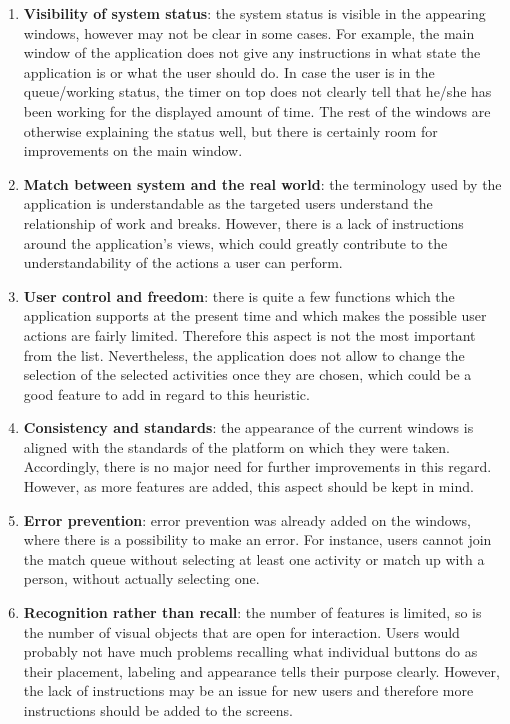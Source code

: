 \begin{enumerate}
	\item \textbf{Visibility of system status}: the system status is visible in the appearing windows, however may not be clear in some cases. For example, the main window of the application does not give any instructions in what state the application is or what the user should do. In case the user is in the queue/working status, the timer on top does not clearly tell that he/she has been working for the displayed amount of time. The rest of the windows are otherwise explaining the status well, but there is certainly room for improvements on the main window. 
	\item \textbf{Match between system and the real world}: the terminology used by the application is understandable as the targeted users understand the relationship of work and breaks. However, there is a lack of instructions around the application's views, which could greatly contribute to the understandability of the actions a user can perform.
	\item \textbf{User control and freedom}: there is quite a few functions which the application supports at the present time and which makes the possible user actions are fairly limited. Therefore this aspect is not the most important from the list. Nevertheless, the application does not allow to change the selection of the selected activities once they are chosen, which could be a good feature to add in regard to this heuristic. 
	\item \textbf{Consistency and standards}: the appearance of the current windows is aligned with the standards of the platform on which they were taken. Accordingly, there is no major need for further improvements in this regard. However, as more features are added, this aspect should be kept in mind.
	\item \textbf{Error prevention}: error prevention was already added on the windows, where there is a possibility to make an error. For instance, users cannot join the match queue without selecting at least one activity or match up with a person, without actually selecting one. 
	\item \textbf{Recognition rather than recall}: the number of features is limited, so is the number of visual objects that are open for interaction. Users would probably not have much problems recalling what individual buttons do as their placement, labeling and appearance tells their purpose clearly. However, the lack of instructions may be an issue for new users and therefore more instructions should be added to the screens.

\end{enumerate}
